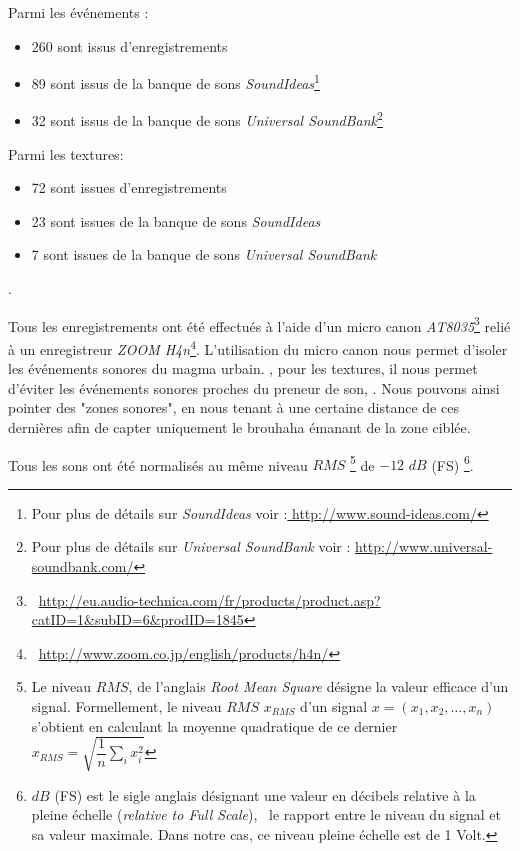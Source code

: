 Parmi les événements :

\begin{itemize}
\item 260 sont issus d’enregistrements
\item 89 sont issus de la banque de sons \emph{SoundIdeas}\footnote{Pour plus de détails sur \emph{SoundIdeas} voir :\url{ http://www.sound-ideas.com/}}
\item 32 sont issus de la banque de sons \emph{Universal SoundBank}\footnote{Pour plus de détails sur \emph{Universal SoundBank} voir : \url{http://www.universal-soundbank.com/}}
\end{itemize}

Parmi les textures:

\begin{itemize}
\item 72 sont issues d’enregistrements
\item 23 sont issues de la banque de sons \emph{SoundIdeas}
\item 7 sont issues de la banque de sons \emph{Universal SoundBank}
\end{itemize}

.

Tous les enregistrements ont été effectués à l’aide d'un micro canon \emph{AT8035}\footnote{\Cf~\url{http://eu.audio-technica.com/fr/products/product.asp?catID=1&subID=6&prodID=1845}} relié à un enregistreur \emph{ZOOM H4n}\footnote{\Cf~\url{http://www.zoom.co.jp/english/products/h4n/}}. L’utilisation du micro canon nous permet d’isoler les événements sonores du magma urbain. , pour les textures, il nous permet d’éviter les événements sonores proches du preneur de son, . Nous pouvons ainsi pointer des "zones sonores", en nous tenant à une certaine distance de ces dernières afin de capter uniquement le brouhaha émanant de la zone ciblée.

Tous les sons ont été normalisés au même niveau $RMS$ \footnote{Le niveau $RMS$, de l'anglais \emph{Root Mean Square}  désigne la valeur efficace d'un signal. Formellement, le niveau $RMS$ $x_{RMS}$ d'un signal $x=(x_1,x_2,\ldots,x_n)$ s'obtient en calculant la moyenne quadratique de ce dernier $x_{RMS}=\sqrt{\dfrac{1}{n}\sum\limits_{i} x_i^2}$} de $-12$ $dB$ (FS) \footnote{$dB$ (FS) est le sigle anglais désignant une valeur en décibels relative à la pleine échelle (\emph{relative to Full Scale}), \ie~le rapport entre le niveau du signal et sa valeur maximale. Dans notre cas, ce niveau pleine échelle est de 1 Volt.}.

